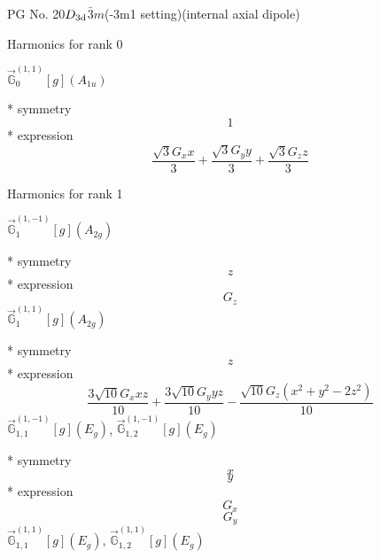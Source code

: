 \documentclass[fleqn,8pt]{jsarticle}
\begin{document}
\setcounter{MaxMatrixCols}{32}

\renewcommand{\tablename}{Table~}
\renewcommand{\figurename}{Figure~}
\begin{center}
\LARGE
PG No. 20\quad$D_{\rm 3d}$\quad$\bar{3}m$\quad(-3m1 setting)\quad[ trigonal ] (internal axial dipole)
\end{center}

\noindent * Harmonics for rank 0

\noindent\quad $\vec{\mathbb{G}}_{0}^{(1,1)}[g](A_{1u})$

\noindent\quad ** symmetry
\begin{dmath*}
1
\end{dmath*}
\noindent\quad ** expression
\begin{dmath*}
\frac{\sqrt{3} G_{x} x}{3} + \frac{\sqrt{3} G_{y} y}{3} + \frac{\sqrt{3} G_{z} z}{3}
\end{dmath*}

\noindent * Harmonics for rank 1

\noindent\quad $\vec{\mathbb{G}}_{1}^{(1,-1)}[g](A_{2g})$

\noindent\quad ** symmetry
\begin{dmath*}
z
\end{dmath*}
\noindent\quad ** expression
\begin{dmath*}
G_{z}
\end{dmath*}
\noindent\quad $\vec{\mathbb{G}}_{1}^{(1,1)}[g](A_{2g})$

\noindent\quad ** symmetry
\begin{dmath*}
z
\end{dmath*}
\noindent\quad ** expression
\begin{dmath*}
\frac{3 \sqrt{10} G_{x} x z}{10} + \frac{3 \sqrt{10} G_{y} y z}{10} - \frac{\sqrt{10} G_{z} \left(x^{2} + y^{2} - 2 z^{2}\right)}{10}
\end{dmath*}
\noindent\quad $\vec{\mathbb{G}}_{1,1}^{(1,-1)}[g](E_{g})$, $\vec{\mathbb{G}}_{1,2}^{(1,-1)}[g](E_{g})$

\noindent\quad ** symmetry
\begin{dmath*}
x
\end{dmath*}
\begin{dmath*}
y
\end{dmath*}
\noindent\quad ** expression
\begin{dmath*}
G_{x}
\end{dmath*}
\begin{dmath*}
G_{y}
\end{dmath*}
\noindent\quad $\vec{\mathbb{G}}_{1,1}^{(1,1)}[g](E_{g})$, $\vec{\mathbb{G}}_{1,2}^{(1,1)}[g](E_{g})$
\end{document}
